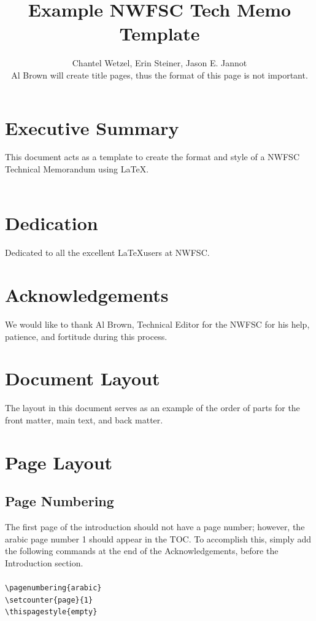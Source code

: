 \documentclass[12pt]{article}
\title{\textcolor[cmyk]{1.00,0.83,0.41,0.36}{Example NWFSC Tech Memo Template}}
\author{Chantel Wetzel, Erin Steiner, Jason E. Jannot\\
\small{Al Brown will create title pages, thus the format of this page is not important.}}
\begin{document}
\maketitle
\thispagestyle{empty}
\newpage
\normalfont %
\normalsize %
\setcounter{page}{3}     %
\tableofcontents
\newpage
\listoftables
\newpage
\listoffigures
\newpage
\section{Executive Summary}
This document acts as a template to create the format and style of a NWFSC Technical Memorandum using \LaTeX.\\
\\
\lipsum[1]
\lipsum[2]
\newpage
\section{Dedication}
Dedicated to all the excellent \LaTeX  users at NWFSC.
\newpage
\section{Acknowledgements}
We would like to thank Al Brown, Technical Editor for the NWFSC for his help, patience, and fortitude during this process.
\newpage
{}
\setcounter{page}{1}
\thispagestyle{empty}	
\section{Document Layout}
The layout in this document serves as an example of the order of parts for the front matter, main text, and back matter.
\section{Page Layout}
\subsection{Page Numbering}
The first page of the introduction should not have a page number; however, the arabic page number 1 should appear in the TOC. To accomplish this, simply add the following commands at the end of the Acknowledgements, before the Introduction section.\\
\\
\texttt{\textbackslash pagenumbering\{arabic\}\\
	\textbackslash setcounter\{page\}\{1\}\\
	\textbackslash thispagestyle\{empty\}\\
}
\end{document}
